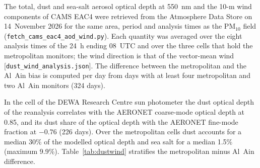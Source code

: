 \documentclass[11pt]{article}
\newcommand*{\ugm}{\ensuremath{\mu\mathrm{g\,m^{-3}}}}
\newcommand*{\pmten}{\ensuremath{\mathrm{PM_{10}}}}
\begin{document}
The total, dust and sea-salt aerosol optical depth at 550~nm and the 10-m wind components of
CAMS EAC4 were retrieved from the Atmosphere Data Store on 14~November 2026 for the same area,
period and analysis times as the \pmten{} field (\texttt{fetch\_cams\_eac4\_aod\_wind.py}). Each
quantity was averaged over the eight analysis times of the 24~h ending 08~UTC and over the three
cells that hold the metropolitan monitors; the wind direction is that of the vector-mean wind
[\texttt{dust\_wind\_analysis.json}]. The difference between the metropolitan and the Al~Ain bias
is computed per day from days with at least four metropolitan and two Al~Ain monitors (324 days).

In the cell of the DEWA Research Centre sun photometer the dust optical depth of the reanalysis
correlates with the AERONET coarse-mode optical depth at 0.85, and its dust share of the optical
depth with the AERONET fine-mode fraction at $-0.76$ (226 days). Over the metropolitan cells dust
accounts for a median 30\% of the modelled optical depth and sea salt for a median 1.5\%
(maximum 9.9\%). Table~\ref{tab:dustwind} stratifies the metropolitan minus Al~Ain difference.

\begin{table}[ht]\centering\small
\caption{Metropolitan minus Al~Ain bias (median over days, \ugm{}; in brackets without
Al~Mafraq) by tercile of the CAMS dust optical depth and of the 10-m wind speed over the
metropolitan cells and by wind sector, and Spearman correlations. The Mann--Whitney test of the
two wind sectors gives $p=0.22$.}
\label{tab:dustwind}
\resizebox{\textwidth}{!}{}
\end{table}
\end{document}
